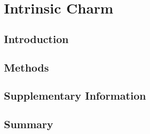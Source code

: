 
\chapter{Intrinsic Charm}
\label{ch:ic}
\minitoc
\adjustmtc



\section{Introduction}
\label{sec:ic/intro}


\section{Methods}
\label{sec:ic/methods}


\section{Supplementary Information}
\label{sec:ic/supplementary}


\section{Summary}
\label{sec:ic/summary}

